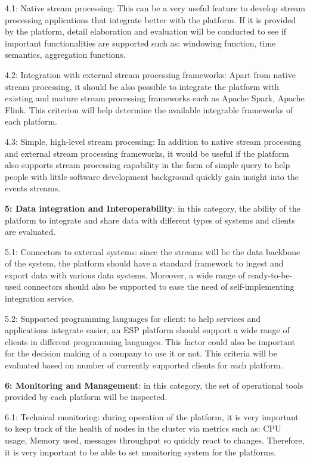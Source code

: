 4.1: Native stream processing: This can be a very useful feature to develop stream processing applications that integrate better with the platform. If it is provided by the platform, detail elaboration and evaluation will be conducted to see if important functionalities are supported such as: windowing function, time semantics, aggregation functions.

4.2: Integration with external stream processing frameworks: Apart from native stream processing, it should be also possible to integrate the platform with existing and mature stream processing frameworks such as Apache Spark, Apache Flink. This criterion will help determine the available integrable frameworks of each platform.

4.3: Simple, high-level stream processing: In addition to native stream processing and external stream processing frameworks, it would be useful if the platform also supports stream processing capability in the form of simple query to help people with little software development background quickly gain insight into the events streams. 

\textbf{5: Data integration and Interoperability}: in this category, the ability of the platform to integrate and share data with different types of systems and clients are evaluated.

5.1: Connectors to external systems: since the streams will be the data backbone of the system, the platform should have a standard framework to ingest and export data with various data systems. Moreover, a wide range of ready-to-be-used connectors should also be supported to ease the need of self-implementing integration service.

5.2: Supported programming languages for client: to help services and applications integrate easier, an ESP platform should support a wide range of clients in different programming languages. This factor could also be important for the decision making of a company to use it or not. This criteria will be evaluated based on number of currently supported clients for each platform.

\textbf{6: Monitoring and Management}: in this category, the set of operational tools provided by each platform will be inspected. 

6.1: Technical monitoring: during operation of the platform, it is very important to keep track of the health of nodes in the cluster via metrics such as: CPU usage, Memory used, messages throughput so quickly react to changes. Therefore, it is very important to be able to set monitoring system for the platforms.

